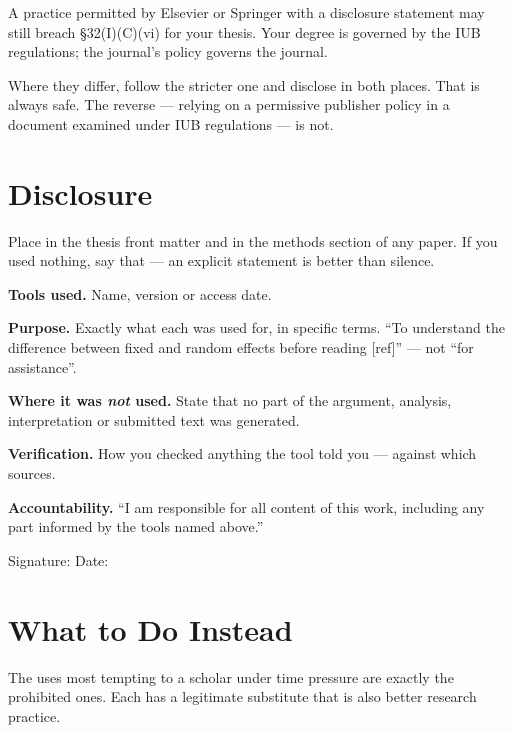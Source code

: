 \begin{alertbox}
A practice permitted by Elsevier or Springer with a disclosure statement may
still breach \S32(I)(C)(vi) for your thesis. Your degree is governed by the
IUB regulations; the journal's policy governs the journal.

\medskip
Where they differ, follow the stricter one and disclose in both places. That is
always safe. The reverse --- relying on a permissive publisher policy in a
document examined under IUB regulations --- is not.
\end{alertbox}

\section{Disclosure}

\begin{templatebox}
Place in the thesis front matter and in the methods section of any paper. If
you used nothing, say that --- an explicit statement is better than silence.

\medskip
\textbf{Tools used.} Name, version or access date.

\noindent\textbf{Purpose.} Exactly what each was used for, in specific terms.
``To understand the difference between fixed and random effects before reading
[ref]'' --- not ``for assistance''.

\noindent\textbf{Where it was \emph{not} used.} State that no part of the
argument, analysis, interpretation or submitted text was generated.

\noindent\textbf{Verification.} How you checked anything the tool told you ---
against which sources.

\noindent\textbf{Accountability.} ``I am responsible for all content of this
work, including any part informed by the tools named above.''

\medskip
\noindent Signature: \fillline{5cm} \quad Date: \fillline{3cm}
\end{templatebox}

\section{What to Do Instead}

The uses most tempting to a scholar under time pressure are exactly the
prohibited ones. Each has a legitimate substitute that is also better research
practice.

